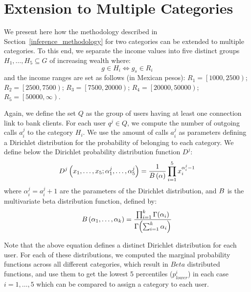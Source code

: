 \section{Extension to Multiple Categories}

We present here how the methodology described in Section~\ref{inference_methodology} for
two categories can be extended to multiple categories.
To this end, we separate the income values into five distinct groups $ H_1, \ldots, H_5 \subseteq G$ of increasing wealth where:
\[
	g \in H_i \iff g_s \in R_i
\]
and the income ranges are set as follows (in Mexican pesos):
	$R_1 = \left[1000, 2500\right) $;
	$R_2 = \left[2500, 7500\right) $;
	$R_3 = \left[7500, 20000\right) $;
	$R_4 = \left[20000, 50000\right) $;
	$R_5 = \left[50000, \infty\right) $.

Again, we define the set $Q$ as the group of users having at least one connection link to bank clients. For each user $q^j \in Q$, we compute the number of outgoing calls $a^j_i$ to the category $H_i$. 
We use the amount of calls $a^j_i$  as parameters defining a Dirichlet distribution for the probability of belonging to each category. 
We define below the Dirichlet probability distribution function $D^j$:  
\begin{equation}
D^j \left( x_1, \ldots, x_5; \alpha^j_1, \ldots, \alpha^j_5 \right) = \frac{1}{B \left( \alpha \right)} \prod^5_{i = 1} x_i^{\alpha^j_i - 1}
\label{Dirichlet}
\end{equation}
where $\alpha^j_i = a^j_i +1$ are the parameters of the Dirichlet distribution, and $B$ is the multivariate beta distribution function, defined by: %
\begin{equation}
B \left( \alpha_1, \ldots, \alpha_k \right) = \frac{\prod^k_{i = 1} \Gamma \! \left( \alpha_i \right)}{\Gamma \! \left( \sum^k_{i = 1} \alpha_i \right) }
\label{Beta} 
\end{equation}

Note that the above equation defines a distinct Dirichlet distribution for each user. For each of these distributions, we computed the marginal probability functions across all different categories, which result in $Beta$ distributed functions, and use them to get the  lowest 5 percentiles ($p^i_{lower}$) in each case ${i=1, \ldots, 5}$ which can be compared to assign a category to each user. 

